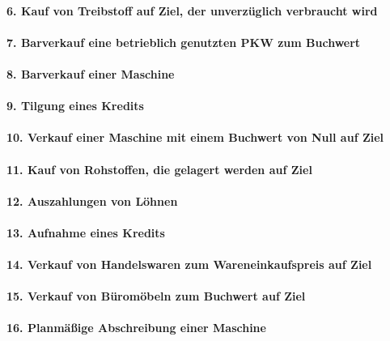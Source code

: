 \documentclass[paper=a4, fontsize=11pt]{scrartcl}
\numberwithin{equation}{section}
\numberwithin{figure}{section}
\numberwithin{table}{section}
\begin{document}
\paragraph{6. Kauf von Treibstoff auf Ziel, der unverzüglich verbraucht wird}

\paragraph{7. Barverkauf eine betrieblich genutzten PKW zum Buchwert}

\paragraph{8. Barverkauf einer Maschine}

\paragraph{9. Tilgung eines Kredits}

\paragraph{10. Verkauf einer Maschine mit einem Buchwert von Null auf Ziel}

\paragraph{11. Kauf von Rohstoffen, die gelagert werden auf Ziel}

\paragraph{12. Auszahlungen von Löhnen}

\paragraph{13. Aufnahme eines Kredits}

\paragraph{14. Verkauf von Handelswaren zum Wareneinkaufspreis auf Ziel}

\paragraph{15. Verkauf von Büromöbeln zum Buchwert auf Ziel}

\paragraph{16. Planmäßige Abschreibung einer Maschine}
\end{document}
